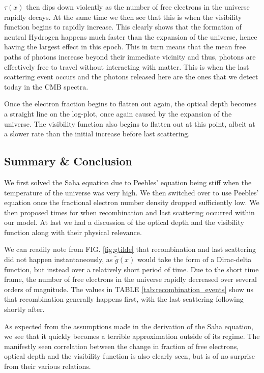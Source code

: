 \documentclass[%
reprint,
 amsmath,amssymb,
 aps,
]{revtex4-2}
\begin{document}
$\tau(x)$ then dips down violently as the number of free electrons in the universe rapidly decays. At the same time we then see that this is when the visibility function begins to rapidly increase. This  clearly shows that the formation of neutral Hydrogen happens much faster than the expansion of the universe, hence having the largest effect in this epoch. This in turn means that the mean free paths of photons increase beyond their immediate vicinity and thus, photons are effectively free to travel without interacting with matter. This is when the last scattering event occurs and the photons released here are the ones that we detect today in the CMB spectra. 

Once the electron fraction begins to flatten out again, the optical depth becomes a straight line on the log-plot, once again caused by the expansion of the universe. The visibility function also begins to flatten out at this point, albeit at a slower rate than the initial increase before last scattering. 


\subsection{Summary \& Conclusion}
We first solved the Saha equation due to Peebles' equation being stiff when the temperature of the universe was very high. We then switched over to use Peebles' equation once the fractional electron number density dropped sufficiently low. We then proposed times for when recombination and last scattering occurred within our model. At last we had a discussion of the optical depth and the visibility function along with their physical relevance.

We can readily note from FIG. \ref{fig:gtilde} that recombination and last scattering did not happen instantaneously, as $\tilde g(x)$ would take the form of a Dirac-delta function, but instead over a relatively short period of time. Due to the short time frame, the number of free electrons in the universe rapidly decreased over several orders of magnitude. The values in TABLE \ref{tab:recombination_events} show us that recombination generally happens first, with the last scattering following shortly after.

As expected from the assumptions made in the derivation of the Saha equation, we see that it quickly becomes a terrible approximation outside of its regime. The manifestly seen correlation between the change in fraction of free electrons, optical depth and the visibility function is also clearly seen, but is of no surprise from their various relations.
\end{document}
